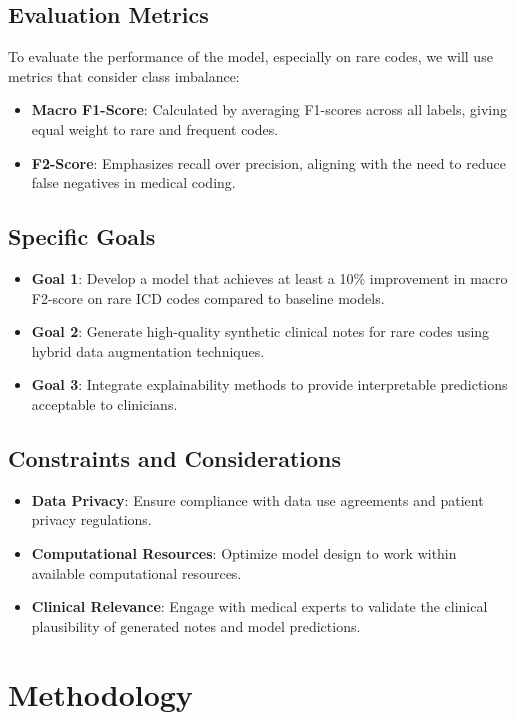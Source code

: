 \documentclass[12pt,a4paper]{report}
\begin{document}
\section{Evaluation Metrics}
To evaluate the performance of the model, especially on rare codes, we will use metrics that consider class imbalance:
\begin{itemize}
    \item \textbf{Macro F1-Score}: Calculated by averaging F1-scores across all labels, giving equal weight to rare and frequent codes.
    \item \textbf{F2-Score}: Emphasizes recall over precision, aligning with the need to reduce false negatives in medical coding.
\end{itemize}

\section{Specific Goals}
\begin{itemize}
    \item \textbf{Goal 1}: Develop a model that achieves at least a 10\% improvement in macro F2-score on rare ICD codes compared to baseline models.
    \item \textbf{Goal 2}: Generate high-quality synthetic clinical notes for rare codes using hybrid data augmentation techniques.
    \item \textbf{Goal 3}: Integrate explainability methods to provide interpretable predictions acceptable to clinicians.
\end{itemize}

\section{Constraints and Considerations}
\begin{itemize}
    \item \textbf{Data Privacy}: Ensure compliance with data use agreements and patient privacy regulations.
    \item \textbf{Computational Resources}: Optimize model design to work within available computational resources.
    \item \textbf{Clinical Relevance}: Engage with medical experts to validate the clinical plausibility of generated notes and model predictions.
\end{itemize}

\chapter{Methodology}
\end{document}
